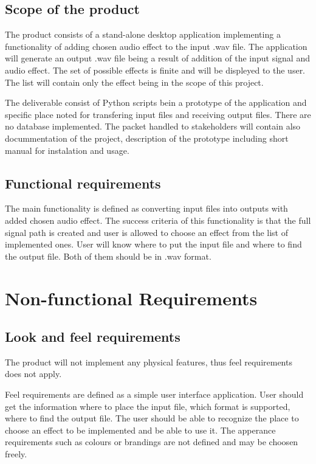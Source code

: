\documentclass[12pt]{article}
\begin{document}
\subsection{Scope of the product}

	The product consists of a stand-alone desktop application implementing a functionality of adding chosen audio effect to the input .wav file. The application will generate an output .wav file being a result of addition of the input signal and audio effect. The set of possible effects is finite and will be displeyed to the user. The list will contain only the effect being in the scope of this project.
	
	The deliverable consist of Python scripts bein a prototype of the application and specific place noted for transfering input files and receiving output files. There are no database implemented. The packet handled to stakeholders will contain also docummentation of the project, description of the prototype including short manual for instalation and usage.

\subsection{Functional requirements}

	The main functionality is defined as converting input files into outputs with added chosen audio effect. The success criteria of this functionality is that the full signal path is created and user is allowed to choose an effect from the list of implemented ones. User will know where to put the input file and where to find the output file. Both of them should be in .wav format.

\section{Non-functional Requirements}

\subsection{Look and feel requirements}

	The product will not implement any physical features, thus feel requirements does not apply.
	
	Feel requirements are defined as a simple user interface application. User should get the information where to place the input file, which format is supported, where to find the output file. The user should be able to recognize the place to choose an effect to be implemented and be able to use it. The apperance requirements such as colours or brandings are not defined and may be choosen freely.
\end{document}
